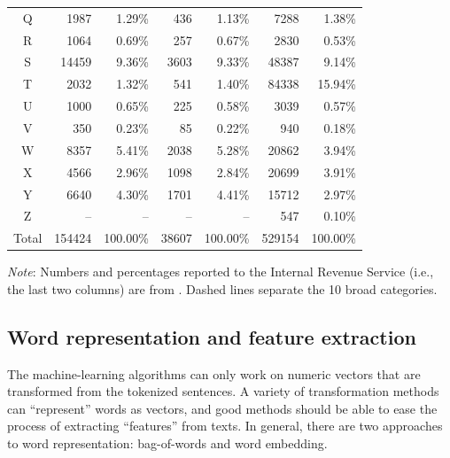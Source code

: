 \documentclass[11pt]{article}
\begin{document}
\begin{table}[t]
\begin{threeparttable}
\begin{tabularx}{\textwidth}{c|r|r|r|r|r|r}
			\hdashline
			Q & \num{1987} & \num{1.29}\% & \num{436} & \num{1.13}\% & \num{7288} & \num{1.38}\% \\
			\hdashline
			R & \num{1064} & \num{0.69}\% & \num{257} & \num{0.67}\% & \num{2830} & \num{0.53}\% \\
			S & \num{14459} & \num{9.36}\% & \num{3603} & \num{9.33}\% & \num{48387} & \num{9.14}\% \\
			T & \num{2032} & \num{1.32}\% & \num{541} & \num{1.40}\% & \num{84338} & \num{15.94}\% \\
			U & \num{1000} & \num{0.65}\% & \num{225} & \num{0.58}\% & \num{3039} & \num{0.57}\% \\
			V & \num{350} & \num{0.23}\% & \num{85} & \num{0.22}\% & \num{940} & \num{0.18}\% \\
			W & \num{8357} & \num{5.41}\% & \num{2038} & \num{5.28}\% & \num{20862} & \num{3.94}\% \\
			\hdashline
			X & \num{4566} & \num{2.96}\% & \num{1098} & \num{2.84}\% & \num{20699} & \num{3.91}\% \\
			\hdashline
			Y & \num{6640} & \num{4.30}\% & \num{1701} & \num{4.41}\% & \num{15712} & \num{2.97}\% \\
			\hdashline
			Z & -- & -- & -- & -- & \num{547} & \num{0.10}\% \\
			\hline
			Total & \num{154424} & \num{100.00}\% & \num{38607} & \num{100.00}\% & \num{529154} & \num{100.00}\% \\
         \hline
    \end{tabularx}
    \begin{tablenotes}
    \item\footnotesize \textit{Note}: Numbers and percentages reported to the Internal Revenue Service (i.e., the last two columns) are from \textcite{McKeeverNonprofitAlmanacEssential2016}. Dashed lines separate the 10 broad categories.
    \end{tablenotes}
    \end{threeparttable}
\end{table}

\subsection{Word representation and feature extraction}

The machine-learning algorithms can only work on numeric vectors that are transformed from the tokenized sentences. A variety of transformation methods can ``represent'' words as vectors, and good methods should be able to ease the process of extracting ``features'' from texts. In general, there are two approaches to word representation: bag-of-words and word embedding.
\end{document}
